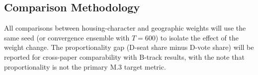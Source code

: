 \subsection{Comparison Methodology}

All comparisons between housing-character and geographic weights will use
the same seed (or convergence ensemble with $T = 600$) to isolate the effect
of the weight change.
The proportionality gap (D-seat share minus D-vote share) will be reported
for cross-paper comparability with B-track results, with the note that
proportionality is not the primary M.3 target metric.
